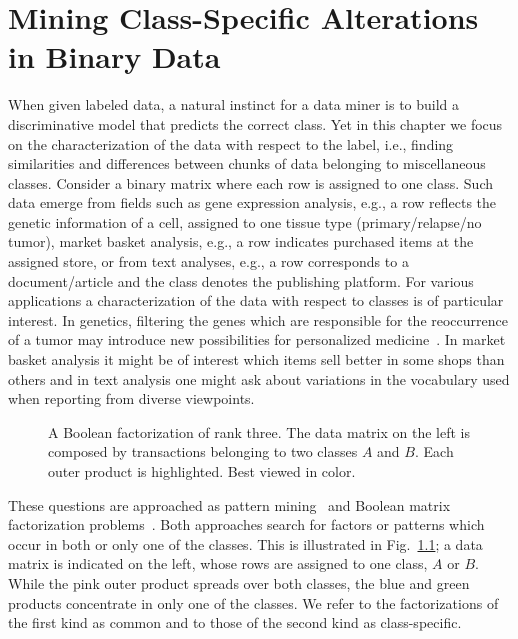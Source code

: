 \chapter{Mining Class-Specific Alterations in Binary Data}
When given labeled data, a natural instinct for a data miner is to build a discriminative model that predicts the correct class.
Yet in this chapter we focus on the characterization of the data with respect to the label, i.e., finding similarities and differences between chunks of data belonging to miscellaneous classes.
Consider a binary matrix where each row is assigned to one class. Such data emerge from fields such as gene expression analysis, e.g., a row reflects the genetic information of a cell, assigned to one tissue type (primary/relapse/no tumor), market basket analysis, e.g., a row indicates purchased items at the assigned store, or from text analyses, e.g., a row corresponds to a document/article and the class denotes the publishing platform. For various applications a characterization of the data with respect to classes is of particular interest. In genetics, filtering the genes which are responsible for the reoccurrence of a tumor may introduce new possibilities for personalized medicine~\cite{schramm2015mutational}. In market basket analysis it might be of interest which items sell better in some shops  than others and in text analysis one might ask about variations in the vocabulary used when reporting from diverse viewpoints.
 \begin{figure}
 \centering
 
 \caption{A Boolean factorization of rank three. The data matrix on the left is composed by transactions belonging to two classes $A$ and $B$. Each outer product is highlighted. Best viewed in color.}
 \label{fig:classFact}
 \end{figure}

These questions are approached as pattern mining~\cite{vreeken2007characterising} and Boolean matrix factorization problems~\cite{miettienen2012finding}. Both approaches search for factors or patterns which occur in both or only one of the classes. This is illustrated in Fig.~\ref{fig:classFact}; a data matrix is indicated on the left, whose rows are assigned to one class, $A$ or $B$. While the pink outer product spreads over both classes, the blue and green products concentrate in only one of the classes. We refer to the factorizations of the first kind as common and to those of the second kind as class-specific.

